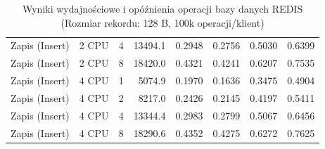\begin{table}[ht]
{\begin{tabular}{llcrrrrr}
Zapis (Insert) & 2 CPU & 4 & 13494.1 & 0.2948 & 0.2756 & 0.5030 & 0.6399 \\
Zapis (Insert) & 2 CPU & 8 & 18420.0 & 0.4321 & 0.4241 & 0.6207 & 0.7535 \\
Zapis (Insert) & 4 CPU & 1 & 5074.9 & 0.1970 & 0.1636 & 0.3475 & 0.4904 \\
Zapis (Insert) & 4 CPU & 2 & 8217.0 & 0.2426 & 0.2145 & 0.4197 & 0.5411 \\
Zapis (Insert) & 4 CPU & 4 & 13344.4 & 0.2983 & 0.2799 & 0.5067 & 0.6456 \\
Zapis (Insert) & 4 CPU & 8 & 18290.6 & 0.4352 & 0.4275 & 0.6272 & 0.7625 \\
\bottomrule
\end{tabular}%
}
\caption{Wyniki wydajnościowe i opóźnienia operacji bazy danych REDIS (Rozmiar rekordu: 128 B, 100k operacji/klient)}
\label{tab:latency_redis_small_100000}
\end{table}
